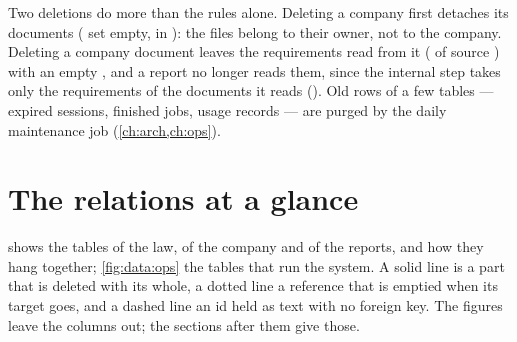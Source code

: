 Two deletions do more than the rules alone. Deleting a company first detaches its documents
( set empty, in ): the
files belong to their owner, not to the company. Deleting a company document leaves the
requirements read from it ( of source ) with an empty
, and a report no longer reads them, since the internal step takes only
the requirements of the documents it reads (). Old rows of a few
tables --- expired sessions, finished jobs, usage records --- are purged by the daily
maintenance job (\cref{ch:arch,ch:ops}).

\section{The relations at a glance}\label{sec:data:figures}

 shows the tables of the law, of the company and of the reports, and how they
hang together; \cref{fig:data:ops} the tables that run the system. A solid line is a part that
is deleted with its whole, a dotted line a reference that is emptied when its target goes, and
a dashed line an id held as text with no foreign key. The figures leave the columns out; the
sections after them give those.

